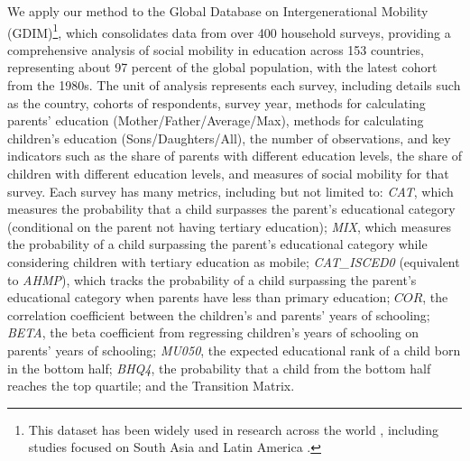 We apply our method to the Global Database on Intergenerational Mobility (GDIM)\footnote{This dataset has been widely used in research across the world \citep{nybom2018intergenerational, duong2024really, van2024intergenerational, clemente2025using, leone2019intergenerational}, including studies focused on South Asia \citep{khan2024intergenerational} and Latin America \citep{torche2021intergenerational}.}, which consolidates data from over 400 household surveys, providing a comprehensive analysis of social mobility in education across 153 countries, representing about 97 percent of the global population, with the latest cohort from the 1980s. The unit of analysis represents each survey, including details such as the country, cohorts of respondents, survey year, methods for calculating parents' education (Mother/Father/Average/Max), methods for calculating children's education (Sons/Daughters/All), the number of observations, and key indicators such as the share of parents with different education levels, the share of children with different education levels, and measures of social mobility for that survey. Each survey has many metrics, including but not limited to: \textit{CAT}, which measures the probability that a child surpasses the parent's educational category (conditional on the parent not having tertiary education); \textit{MIX}, which measures the probability of a child surpassing the parent's educational category while considering children with tertiary education as mobile; \textit{CAT\_ISCED0} (equivalent to \textit{AHMP}), which tracks the probability of a child surpassing the parent's educational category when parents have less than primary education; $COR$, the correlation coefficient between the children's and parents' years of schooling; \textit{BETA}, the beta coefficient from regressing children's years of schooling on parents' years of schooling; \textit{MU050}, the expected educational rank of a child born in the bottom half; \textit{BHQ4}, the probability that a child from the bottom half reaches the top quartile; and the Transition Matrix.

